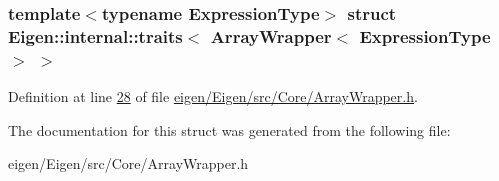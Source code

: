 \subsubsection*{template$<$typename Expression\+Type$>$\newline
struct Eigen\+::internal\+::traits$<$ Array\+Wrapper$<$ Expression\+Type $>$ $>$}



Definition at line \hyperlink{eigen_2_eigen_2src_2_core_2_array_wrapper_8h_source_l00028}{28} of file \hyperlink{eigen_2_eigen_2src_2_core_2_array_wrapper_8h_source}{eigen/\+Eigen/src/\+Core/\+Array\+Wrapper.\+h}.



The documentation for this struct was generated from the following file\+:\begin{DoxyCompactItemize}
\item 
eigen/\+Eigen/src/\+Core/\+Array\+Wrapper.\+h\end{DoxyCompactItemize}
